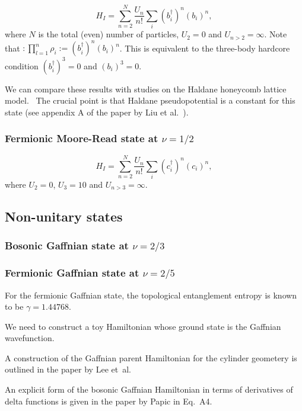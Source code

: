 \documentclass[floatfix,showpacs,amsmath,amsfonts,amssymb,aps,twocolumn, prb,groupedaddress]{revtex4-1}
\begin{document}
\begin{equation}
H_I = \sum_{n=2}^N \frac{U_n}{n!} \sum_{i} (b^\dagger_i)^n (b_i)^n,
\end{equation}
where $N$ is the total (even) number of particles, $U_2=0$ and $U_{n>2}=\infty$. Note that $:\prod_{l=1}^n \rho_i:=(b^\dagger_i)^n (b_i)^n$. This is equivalent to the three-body hardcore condition $(b^\dagger_i)^3=0$ and $(b_i)^3=0$.~\cite{Zhu15}

We can compare these results with studies on the Haldane honeycomb lattice model.~\cite{Zhu15, Wang12}  The crucial point is that Haldane pseudopotential is a constant for this state (see appendix A of the paper by Liu et al.~\cite{Liu12}).

\subsubsection{Fermionic Moore-Read state at $\nu=1/2$}

\begin{equation}
H_I = \sum_{n=2}^N \frac{U_n}{n!} \sum_{i} (c^\dagger_i)^n (c_i)^n,
\end{equation}
where $U_2=0$, $U_3=10$ and $U_{n>3}=\infty$.

\subsection{Non-unitary states}

\subsubsection{Bosonic Gaffnian state at $\nu=2/3$}

\subsubsection{Fermionic Gaffnian state at $\nu=2/5$}

For the fermionic Gaffnian state, the topological entanglement entropy is known to be $\gamma=1.44768$.~\cite{Estienne15}

We need to construct a toy Hamiltonian whose ground state is the Gaffnian wavefunction.

A construction of the Gaffnian parent Hamiltonian for the cylinder geometery is outlined in the paper by Lee et~al.~\cite{Lee15}

An explicit form of the bosonic Gaffnian Hamiltonian in terms of derivatives of delta functions is given in the paper by Papic in Eq.~A4.~\cite{Papic14}
\end{document}
